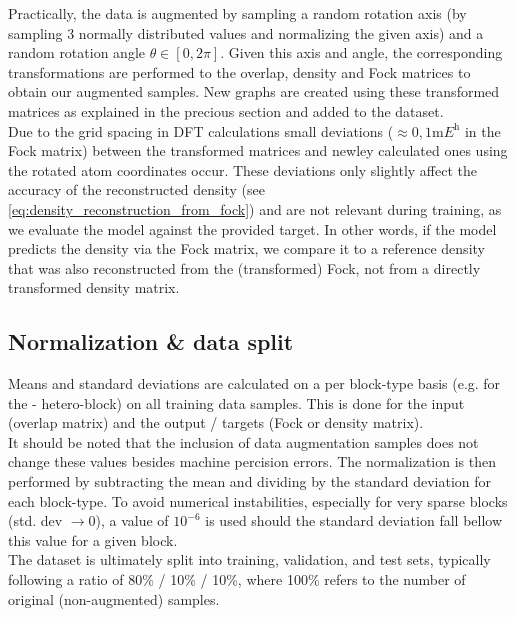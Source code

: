 Practically, the data is augmented by sampling a random rotation axis (by sampling 3 normally distributed values and normalizing the given axis) and a random rotation angle $\theta \in [0, 2\pi]$. Given this axis and angle, the corresponding transformations are performed to the overlap, density and Fock matrices to obtain our augmented samples. New graphs are created using these transformed matrices as explained in the precious section and added to the dataset. \\
Due to the grid spacing in DFT calculations small deviations ($\approx 0,1 \unit{\milli\hartree}$ in the Fock matrix) between the transformed matrices and newley calculated ones using the rotated atom coordinates occur. These deviations only slightly affect the accuracy of the reconstructed density (see \autoref{eq:density_reconstruction_from_fock}) and are not relevant during training, as we evaluate the model against the provided target. In other words, if the model predicts the density via the Fock matrix, we compare it to a reference density that was also reconstructed from the (transformed) Fock, not from a directly transformed density matrix.\\

\subsection{Normalization \& data split}
\label{subsec:gnn_normalization}
Means and standard deviations are calculated on a per block-type basis (e.g. for the - hetero-block) on all training data samples. This is done for the input (overlap matrix) and the output / targets (Fock or density matrix).\\
It should be noted that the inclusion of data augmentation samples does not change these values besides machine percision errors. The normalization is then performed by subtracting the mean and dividing by the standard deviation for each block-type. To avoid numerical instabilities, especially for very sparse blocks (std. dev $\rightarrow 0$), a value of $10^{-6}$ is used should the standard deviation fall bellow this value for a given block. \\

The dataset is ultimately split into training, validation, and test sets, typically following a ratio of 80\% / 10\% / 10\%, where 100\% refers to the number of original (non-augmented) samples.

